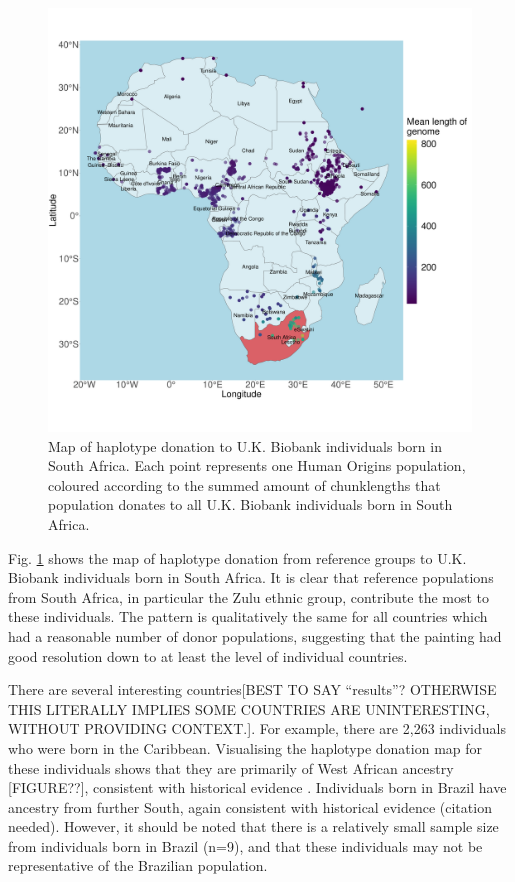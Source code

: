 {\begin{figure}[htp]
    \centering
    \includegraphics[width=1.0\textwidth]{../images/chapter3/haplotype_map_SouthAfrica.pdf}
    \caption{Map of haplotype donation to U.K. Biobank individuals born in South Africa. Each point represents one Human Origins population, coloured according to the summed amount of chunklengths that population donates to all U.K. Biobank individuals born in South Africa. }
    \label{fig:haplotype_map_SouthAfrica}
\end{figure}

Fig. \ref{fig:haplotype_map_SouthAfrica} shows the map of haplotype donation from reference groups to U.K. Biobank individuals born in South Africa. It is clear that reference populations from South Africa, in particular the Zulu ethnic group, contribute the most to these individuals. The pattern is qualitatively the same for all countries which had a reasonable number of donor populations, suggesting that the painting had good resolution down to at least the level of individual countries.

There are several interesting {\color{red}countries[BEST TO SAY ``results''? OTHERWISE THIS LITERALLY IMPLIES SOME COUNTRIES ARE UNINTERESTING, WITHOUT PROVIDING CONTEXT.]}. For example, there are 2,263 individuals who were born in the Caribbean. Visualising the haplotype donation map for these individuals shows that they are primarily of West African ancestry {\color{red}[FIGURE??]}, consistent with historical evidence \cite{micheletti2020genetic}. Individuals born in Brazil have ancestry from further South, again consistent with historical evidence (citation needed). However, it should be noted that there is a relatively small sample size from individuals born in Brazil (n=9), and that these individuals may not be representative of the Brazilian population. 

}
